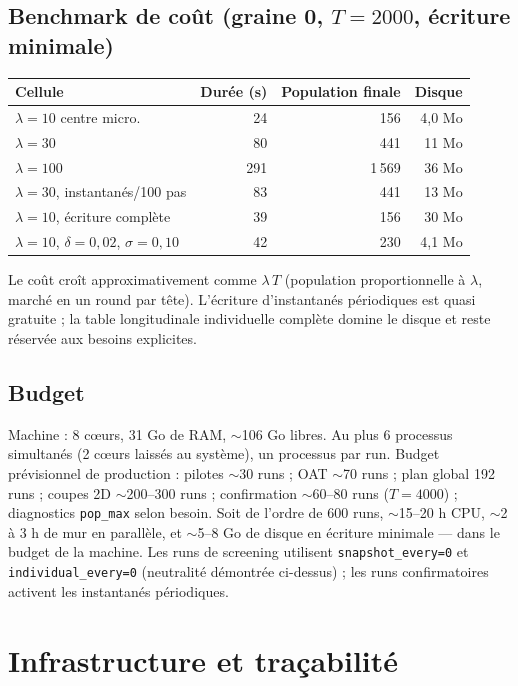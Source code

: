 \documentclass[11pt,a4paper]{article}
\newcommand{\code}[1]{\texttt{#1}}
\begin{document}
\subsection{Benchmark de coût (graine 0, $T=2000$, écriture minimale)}

\begin{center}
\begin{tabular}{@{}lrrr@{}}
\toprule
Cellule & Durée (s) & Population finale & Disque \\
\midrule
$\lambda=10$ centre micro. & 24 & 156 & 4{,}0 Mo \\
$\lambda=30$ & 80 & 441 & 11 Mo \\
$\lambda=100$ & 291 & 1\,569 & 36 Mo \\
$\lambda=30$, instantanés/100 pas & 83 & 441 & 13 Mo \\
$\lambda=10$, écriture complète & 39 & 156 & 30 Mo \\
$\lambda=10$, $\delta=0{,}02$, $\sigma=0{,}10$ & 42 & 230 & 4{,}1 Mo \\
\bottomrule
\end{tabular}
\end{center}

Le coût croît approximativement comme $\lambda\,T$ (population
proportionnelle à $\lambda$, marché en un round par tête). L'écriture
d'instantanés périodiques est quasi gratuite ; la table longitudinale
individuelle complète domine le disque et reste réservée aux besoins
explicites.

\subsection{Budget}

Machine : 8 cœurs, 31 Go de RAM, $\sim$106 Go libres. Au plus 6 processus
simultanés (2 cœurs laissés au système), un processus par run. Budget
prévisionnel de production : pilotes $\sim$30 runs ; OAT $\sim$70 runs ;
plan global 192 runs ; coupes 2D $\sim$200--300 runs ; confirmation
$\sim$60--80 runs ($T=4000$) ; diagnostics \code{pop\_max} selon besoin.
Soit de l'ordre de 600 runs, $\sim$15--20 h CPU, $\sim$2 à 3 h de mur en
parallèle, et $\sim$5--8 Go de disque en écriture minimale --- dans le
budget de la machine. Les runs de screening utilisent
\code{snapshot\_every=0} et \code{individual\_every=0} (neutralité
démontrée ci-dessus) ; les runs confirmatoires activent les instantanés
périodiques.

\section{Infrastructure et traçabilité}
\end{document}
